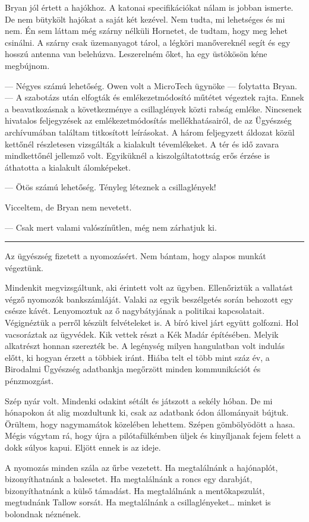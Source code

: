 \documentclass[10pt]{memoir}
\renewcommand{\pfbreakdisplay}{\bigskip \ding{70} \bigskip}
\newcommand{\secbreak}{\fancybreak{\pfbreakdisplay}}
\begin{document}
Bryan jól értett a hajókhoz. A katonai specifikációkat nálam is jobban ismerte.
De nem bütykölt hajókat a saját két kezével. Nem tudta, mi lehetséges és mi
nem. Én sem láttam még szárny nélküli Hornetet, de tudtam, hogy meg lehet
csinálni. A szárny csak üzemanyagot tárol, a légköri manővereknél segít és egy
hosszú antenna van belehúzva. Leszerelném őket, ha egy üstökösön kéne
megbújnom.

— Négyes számú lehetőség. Owen volt a MicroTech ügynöke — folytatta Bryan. — A
szabotázs után elfogták és emlékezetmódosító műtétet végeztek rajta. Ennek a
beavatkozásnak a következménye a csillaglények közti rabság emléke. Nincsenek
hivatalos feljegyzések az emlékezetmódosítás mellékhatásairól, de az Ügyészség
archívumában találtam titkosított leírásokat. A három feljegyzett áldozat közül
kettőnél részletesen vizsgálták a kialakult tévemlékeket. A tér és idő zavara
mindkettőnél jellemző volt. Egyiküknél a kiszolgáltatottság erős érzése is
áthatotta a kialakult álomképeket.

— Ötös számú lehetőség. Tényleg léteznek a csillaglények!

Vicceltem, de Bryan nem nevetett.

— Csak mert valami valószínűtlen, még nem zárhatjuk ki.

\secbreak

Az ügyészség fizetett a nyomozásért. Nem bántam, hogy alapos munkát végeztünk.

Mindenkit megvizsgáltunk, aki érintett volt az ügyben. Ellenőriztük a vallatást
végző nyomozók bankszámláját. Valaki az egyik beszélgetés során behozott egy
csésze kávét. Lenyomoztuk az ő nagybátyjának a politikai kapcsolatait.
Végignéztük a perről készült felvételeket is. A bíró kivel járt együtt
golfozni. Hol vacsoráztak az ügyvédek. Kik vettek részt a Kék Madár építésében.
Melyik alkatrészt honnan szerezték be. A legénység milyen hangulatban volt
indulás előtt, ki hogyan érzett a többiek iránt. Hiába telt el több mint száz
év, a Birodalmi Ügyészség adatbankja megőrzött minden kommunikációt és
pénzmozgást.

Szép nyár volt. Mindenki odakint sétált és játszott a sekély hóban. De mi
hónapokon át alig mozdultunk ki, csak az adatbank ódon állományait bújtuk.
Örültem, hogy nagymamátok közelében lehettem. Szépen gömbölyödött a hasa. Mégis
vágytam rá, hogy újra a pilótafülkémben üljek és kinyíljanak fejem felett a
dokk súlyos kapui. Eljött ennek is az ideje.

A nyomozás minden szála az űrbe vezetett. Ha megtalálnánk a hajónaplót,
bizonyíthatnánk a balesetet. Ha megtalálnánk a roncs egy darabját,
bizonyíthatnánk a külső támadást. Ha megtalálnánk a mentőkapszulát, megtudnánk
Tallow sorsát. Ha megtalálnánk a csillaglényeket… minket is bolondnak néznének.
\end{document}
